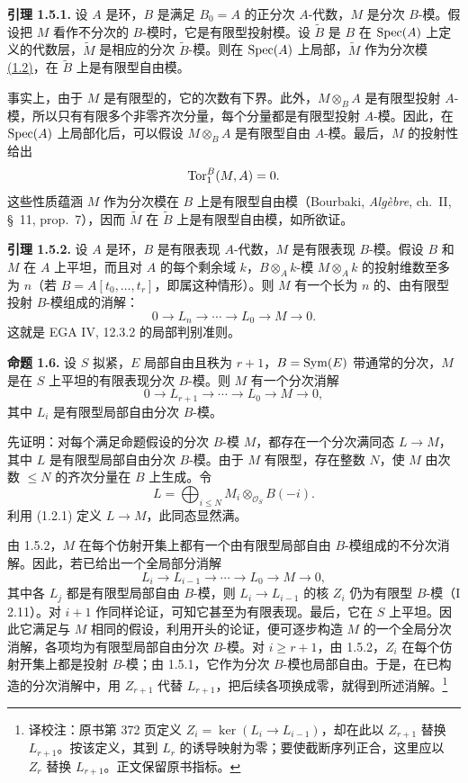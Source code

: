 \textbf{引理 1.5.1.} 设 \(A\) 是环，\(B\) 是满足 \(B_0=A\) 的正分次 \(A\)-代数，\(M\) 是分次 \(B\)-模。假设把 \(M\) 看作不分次的 \(B\)-模时，它是有限型投射模。设 \(\widetilde B\) 是 \(B\) 在 \(\operatorname{Spec}(A)\) 上定义的代数层，\(\widetilde M\) 是相应的分次 \(\widetilde B\)-模。则在 \(\operatorname{Spec}(A)\) 上局部，\(\widetilde M\) 作为分次模 \hyperlink{sga6.e06.prop.1-2}{(1.2)}，在 \(\widetilde B\) 上是有限型自由模。

事实上，由于 \(M\) 是有限型的，它的次数有下界。此外，\(M\otimes_B A\) 是有限型投射 \(A\)-模，所以只有有限多个非零齐次分量，每个分量都是有限型投射 \(A\)-模。因此，在 \(\operatorname{Spec}(A)\) 上局部化后，可以假设 \(M\otimes_B A\) 是有限型自由 \(A\)-模。最后，\(M\) 的投射性给出
\[
 \operatorname{Tor}_1^B(M,A)=0.
\]
这些性质蕴涵 \(M\) 作为分次模在 \(B\) 上是有限型自由模（Bourbaki, \emph{Algèbre}, ch.~II, \S~11, prop.~7），因而 \(\widetilde M\) 在 \(\widetilde B\) 上是有限型自由模，如所欲证。

\textbf{引理 1.5.2.} 设 \(A\) 是环，\(B\) 是有限表现 \(A\)-代数，\(M\) 是有限表现 \(B\)-模。假设 \(B\) 和 \(M\) 在 \(A\) 上平坦，而且对 \(A\) 的每个剩余域 \(k\)，\(B\otimes_A k\)-模 \(M\otimes_A k\) 的投射维数至多为 \(n\)（若 \(B=A[t_0,\ldots,t_r]\)，即属这种情形）。则 \(M\) 有一个长为 \(n\) 的、由有限型投射 \(B\)-模组成的消解：
\[
  0\longrightarrow L_n\longrightarrow\cdots\longrightarrow L_0\longrightarrow M\longrightarrow 0.
\]
这就是 EGA IV, 12.3.2 的局部判别准则。

\textbf{命题 1.6.} 设 \(S\) 拟紧，\(E\) 局部自由且秩为 \(r+1\)，\(B=\operatorname{Sym}(E)\) 带通常的分次，\(M\) 是在 \(S\) 上平坦的有限表现分次 \(B\)-模。则 \(M\) 有一个分次消解
\[
  0\longrightarrow L_{r+1}\longrightarrow\cdots\longrightarrow L_0\longrightarrow M\longrightarrow 0,
\]
其中 \(L_i\) 是有限型局部自由分次 \(B\)-模。

先证明：对每个满足命题假设的分次 \(B\)-模 \(M\)，都存在一个分次满同态 \(L\to M\)，其中 \(L\) 是有限型局部自由分次 \(B\)-模。由于 \(M\) 有限型，存在整数 \(N\)，使 \(M\) 由次数 \(\leq N\) 的齐次分量在 \(B\) 上生成。令
\[
 L=\bigoplus_{i\leq N}M_i\otimes_{\mathcal O_S}B(-i).
\]
利用 (1.2.1) 定义 \(L\to M\)，此同态显然满。

由 1.5.2，\(M\) 在每个仿射开集上都有一个由有限型局部自由 \(B\)-模组成的不分次消解。因此，若已给出一个全局部分消解
\[
 L_i\longrightarrow L_{i-1}\longrightarrow\cdots
 \longrightarrow L_0\longrightarrow M\longrightarrow0,
\]
其中各 \(L_j\) 都是有限型局部自由 \(B\)-模，则 \(L_i\to L_{i-1}\) 的核 \(Z_i\) 仍为有限型 \(B\)-模（I 2.11）。对 \(i+1\) 作同样论证，可知它甚至为有限表现。最后，它在 \(S\) 上平坦。因此它满足与 \(M\) 相同的假设，利用开头的论证，便可逐步构造 \(M\) 的一个全局分次消解，各项均为有限型局部自由分次 \(B\)-模。对 \(i\geq r+1\)，由 1.5.2，\(Z_i\) 在每个仿射开集上都是投射 \(B\)-模；由 1.5.1，它作为分次 \(B\)-模也局部自由。于是，在已构造的分次消解中，用 \(Z_{r+1}\) 代替 \(L_{r+1}\)，把后续各项换成零，就得到所述消解。\footnote{译校注：原书第 372 页定义 \(Z_i=\ker(L_i\to L_{i-1})\)，却在此以 \(Z_{r+1}\) 替换 \(L_{r+1}\)。按该定义，其到 \(L_r\) 的诱导映射为零；要使截断序列正合，这里应以 \(Z_r\) 替换 \(L_{r+1}\)。正文保留原书指标。}


